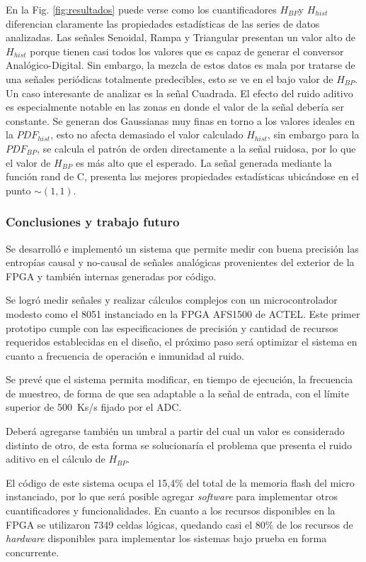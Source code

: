En la Fig. \ref{fig:resultados} puede verse como los cuantificadores $H_{BP}$y $H_{hist}$ diferencian claramente las propiedades estadísticas de las series de datos analizadas.
Las señales Senoidal, Rampa y Triangular presentan un valor alto de $H_{hist}$ porque tienen casi todos los valores que es capaz de generar el conversor Analógico-Digital.
Sin embargo, la mezcla de estos datos es mala por tratarse de una señales periódicas totalmente predecibles, esto se ve en el bajo valor de $H_{BP}$.
Un caso interesante de analizar es la señal Cuadrada.
El efecto del ruido aditivo es especialmente notable en las zonas en donde el valor de la señal debería ser constante.
Se generan dos Gaussianas muy finas en torno a los valores ideales en la $PDF_{hist}$, esto no afecta demasiado el valor calculado $H_{hist}$, sin embargo para la $PDF_{BP}$, se calcula el patrón de orden directamente a la señal ruidosa, por lo que el valor de $H_{BP}$ es más alto que el esperado.
La señal generada mediante la función rand de C, presenta las mejores propiedades estadísticas ubicándose en el punto $\sim(1,1)$.

\subsubsection{Conclusiones y trabajo futuro}
\label{sec:conclusiones}

Se desarrolló e implementó un sistema que permite medir con buena precisión las entropías causal y no-causal de señales analógicas provenientes del exterior de la FPGA y también internas generadas por código.

Se logró medir señales y realizar cálculos complejos con un microcontrolador modesto como el 8051 instanciado en la FPGA AFS1500 de ACTEL.
Este primer prototipo cumple con las especificaciones de precisión y cantidad de recursos requeridos establecidas en el diseño, el próximo paso será optimizar el sistema en cuanto a frecuencia de operación e inmunidad al ruido.

Se prevé que el sistema permita modificar, en tiempo de ejecución, la frecuencia de muestreo, de forma de que sea adaptable a la señal de entrada, con el límite superior de 500~Ks/s fijado por el ADC.

Deberá agregarse también un umbral a partir del cual un valor es considerado distinto de otro, de esta forma se solucionaría el problema que presenta el ruido aditivo en el cálculo de $H_{BP}$.

El código de este sistema ocupa el 15,4\% del total de la memoria flash del micro instanciado, por lo que será posible agregar \textit{software} para implementar otros cuantificadores y funcionalidades.
En cuanto a los recursos disponibles en la FPGA se utilizaron 7349 celdas lógicas, quedando casi el 80\% de los recursos de \textit{hardware} disponibles para implementar los sistemas bajo prueba en forma concurrente.
